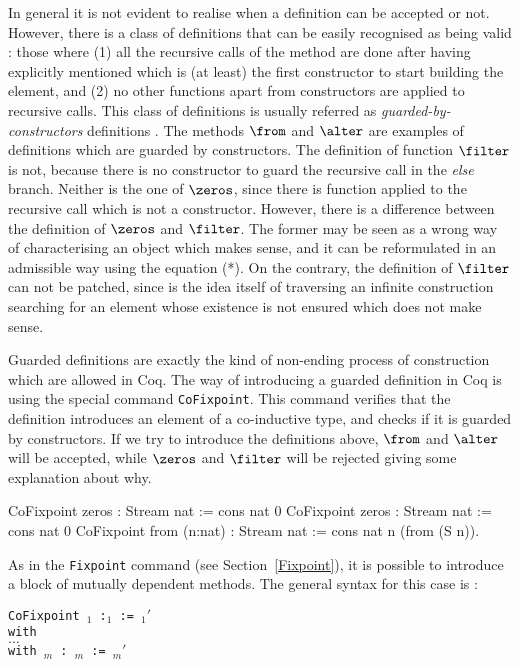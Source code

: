 In general it is not evident to realise when a definition can 
be accepted or not. However, there is a class of definitions that
can be easily recognised as being valid :  those 
where (1) all the recursive calls of the method  are done 
after having explicitly mentioned  which is (at least) the first constructor 
to start building the element, and (2) no other 
functions apart from constructors are applied to recursive calls. 
This class of definitions is usually
referred as {\it guarded-by-constructors} 
definitions \cite{Coquand93,Gim94}. 
The methods $\from$ 
and $\alter$ are examples of definitions which are guarded by constructors.
The definition of function $\filter$ is not, because there is no 
constructor to guard 
the recursive call in the {\it else} branch. Neither is the one of
$\zeros$, since there is function applied to the recursive call
which is not a constructor. However, there is a difference between 
the definition of $\zeros$ and $\filter$. The former may be seen as a
wrong way of characterising an object which makes sense, and it can
be reformulated in an admissible way using the equation (*). On the contrary, 
the definition of
$\filter$ can not be patched, since is the idea itself 
of traversing an infinite
construction searching for an element whose existence is not ensured
which does not make sense.



Guarded definitions are exactly the kind of non-ending process of 
construction which are allowed in Coq. The way of introducing 
a guarded definition in Coq is using the special command 
{\tt CoFixpoint}.  This command verifies that the definition introduces an
element of a co-inductive type, and checks if it is guarded by constructors. 
If we try to 
introduce the definitions above, $\from$ and $\alter$ will be accepted,
while $\zeros$ and $\filter$ will be rejected giving some explanation 
about why.
\begin{coq_example}
CoFixpoint zeros  : Stream nat := cons nat 0%
CoFixpoint zeros  : Stream nat := cons nat 0%
CoFixpoint from (n:nat) : Stream nat := cons nat n (from (S n)).
\end{coq_example}

As in the \verb!Fixpoint! command (see Section~\ref{Fixpoint}), it is possible 
to introduce a block of mutually dependent methods. The general syntax
for this case is :

{\tt CoFixpoint {\ident$_1$}  :{\term$_1$} := {\term$_1'$}\\
     with\\
        \mbox{}\hspace{0.1cm} $\ldots$  \\
        with {\ident$_m$}   : {\term$_m$} := {\term$_m'$}}


